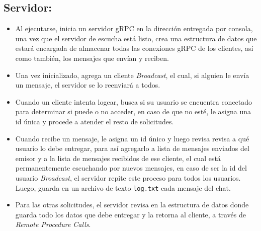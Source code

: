 \documentclass[11pt, letter]{article}
\begin{document}
\subsection{Servidor:}
\begin{itemize}
	\item Al ejecutarse, inicia un servidor gRPC en la dirección entregada por consola, una vez que el servidor de escucha está listo, crea una estructura de datos que estará encargada de almacenar todas las conexiones gRPC de los clientes, así como también, los mensajes que envían y reciben.
	\item Una vez inicializado, agrega un cliente \textit{Broadcast}, el cual, si alguien le envía un mensaje, el servidor se lo reenviará a todos.
	\item Cuando un cliente intenta logear, busca si su usuario se encuentra conectado para determinar si puede o no acceder, en caso de que no esté, le asigna una id única y procede a atender el resto de solicitudes.
	\item Cuando recibe un mensaje, le asigna un id único y luego revisa revisa a qué usuario lo debe entregar, para así agregarlo a lista de mensajes enviados del emisor y a la lista de mensajes recibidos de ese cliente, el cual está permanentemente escuchando por nuevos mensajes, en caso de ser la id del usuario \textit{Broadcast}, el servidor repite este proceso para todos los usuarios. Luego, guarda en un archivo de texto \texttt{log.txt} cada mensaje del chat.
	\item Para las otras solicitudes, el servidor revisa en la estructura de datos donde guarda todo los datos que debe entregar y la retorna al cliente, a través de \textit{Remote Procedure Calls}.
\end{itemize}
\end{document}

